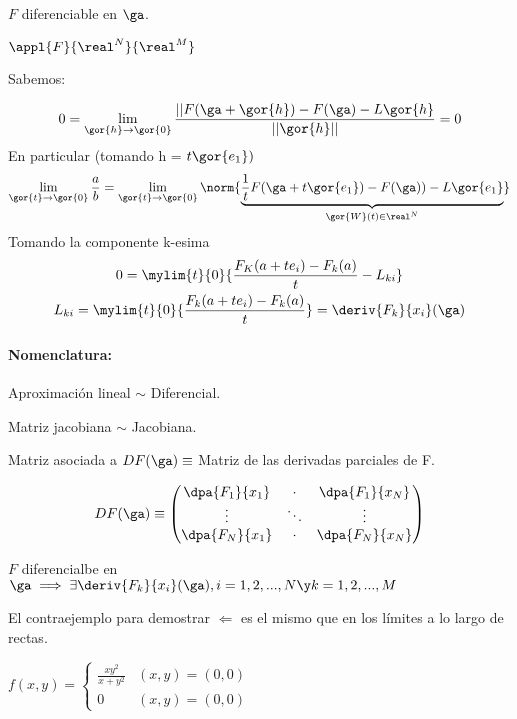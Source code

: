 \documentclass{apuntes}
\begin{document}
\obs
$F$ diferenciable en $\ga$.

$\appl{F}{\real^N}{\real^M}$

Sabemos:

 $$0 = \lim_{\gor{h} \rightarrow \gor{0}} \frac{||F(\ga+\gor{h}) - F(\ga) - L\gor{h}}{||\gor{h}||} = 0 $$
 En particular (tomando  h = $t \gor{e_1})$\\

$$ \lim_{\gor{t} \rightarrow \gor{0}}\frac{a}{b} = \lim_{\gor{t} \rightarrow \gor{0}}\norm{\underbrace{\frac{1}{t} F(\ga+t\gor{e_1})-F(\ga))-L\gor{e_1}}_{\gor{W}(t)\in\real^N}}$$
 Tomando la componente k-esima\\
\begin{gather*}
 0 = \mylim{t}{0}{\frac{F_K(a+te_i)-F_k(a)}{t} - L_{ki}}\\
 L_{ki} = \mylim{t}{0} {\frac{F_k(a+te_i) - F_k(a)}{t}} = \deriv{ F_k}{x_i}(\ga)
\end{gather*}

\paragraph{Nomenclatura: }
Aproximación lineal $\sim$ Diferencial.

Matriz jacobiana $\sim$ Jacobiana.

\begin{theorem}
 Matriz asociada a $DF(\ga) \equiv $ Matriz de las derivadas parciales de F.
 
 $$DF(\ga) \equiv \begin{pmatrix}
                \dpa{F_1}{x_1} & \cdot & \dpa{F_1}{x_N}\\
                \vdots& \ddots & \vdots\\
                \dpa{F_N}{x_1} & \cdot & \dpa{F_N}{x_N}
                \end{pmatrix}
$$
\end{theorem}

\begin{theorem}
 $F$ diferencialbe en $\ga \implies \exists \deriv{F_k}{x_i}(\ga), i=1,2,...,N \y k = 1,2,...,M$
\end{theorem}

El contraejemplo para demostrar $\Leftarrow$ es el mismo que en los límites a lo largo de rectas.

$f(x,y) = \left\{ \begin{matrix}

\frac{xy^2}{x+y^2} & (x,y) = (0,0) \\ 
0 & (x,y)=(0,0)
           
          \end{matrix}\right.
$
\end{document}
